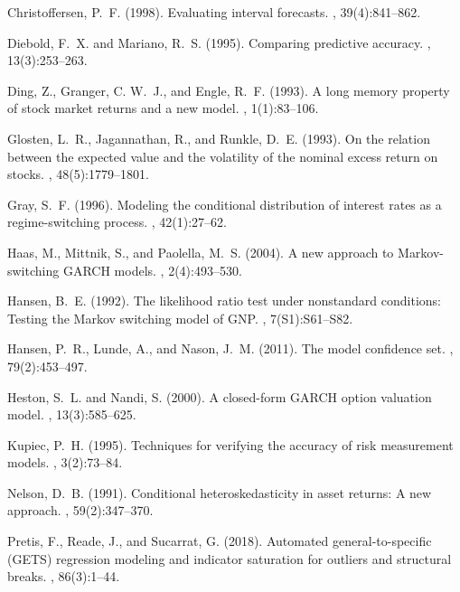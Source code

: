 \documentclass[11pt,a4paper]{article}
\theoremstyle{plain}
\theoremstyle{remark}
\begin{document}
\begin{thebibliography}{}

Christoffersen, P.~F. (1998).
\newblock Evaluating interval forecasts.
, 39(4):841--862.

Diebold, F.~X. and Mariano, R.~S. (1995).
\newblock Comparing predictive accuracy.
, 13(3):253--263.

Ding, Z., Granger, C. W.~J., and Engle, R.~F. (1993).
\newblock A long memory property of stock market returns and a new model.
, 1(1):83--106.

Glosten, L.~R., Jagannathan, R., and Runkle, D.~E. (1993).
\newblock On the relation between the expected value and the volatility of the
  nominal excess return on stocks.
, 48(5):1779--1801.

Gray, S.~F. (1996).
\newblock Modeling the conditional distribution of interest rates as a
  regime-switching process.
, 42(1):27--62.

Haas, M., Mittnik, S., and Paolella, M.~S. (2004).
\newblock A new approach to {M}arkov-switching {GARCH} models.
, 2(4):493--530.

Hansen, B.~E. (1992).
\newblock The likelihood ratio test under nonstandard conditions: Testing the
  {M}arkov switching model of {GNP}.
, 7(S1):S61--S82.

Hansen, P.~R., Lunde, A., and Nason, J.~M. (2011).
\newblock The model confidence set.
, 79(2):453--497.

Heston, S.~L. and Nandi, S. (2000).
\newblock A closed-form {GARCH} option valuation model.
, 13(3):585--625.

Kupiec, P.~H. (1995).
\newblock Techniques for verifying the accuracy of risk measurement models.
, 3(2):73--84.

Nelson, D.~B. (1991).
\newblock Conditional heteroskedasticity in asset returns: A new approach.
, 59(2):347--370.

Pretis, F., Reade, J., and Sucarrat, G. (2018).
\newblock Automated general-to-specific ({GETS}) regression modeling and
  indicator saturation for outliers and structural breaks.
, 86(3):1--44.

\end{thebibliography}
\end{document}
